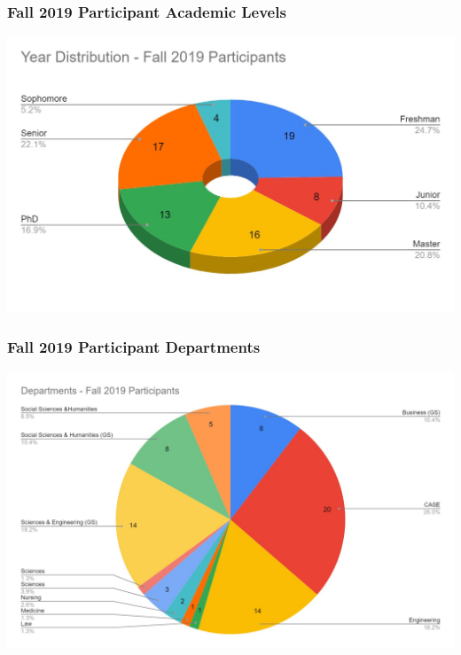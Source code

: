       \begin{frame}
        \frametitle{Fall 2019 Participant Academic Levels}
        \centering
        \includegraphics[height=0.75\textheight]{images/year_distribution_selected_fall2019.jpg}
      \end{frame}

      \begin{frame}
        \frametitle{Fall 2019 Participant Departments}
        \centering
        \includegraphics[height=0.75\textheight]{images/departments_selected_fall2019.jpg}
      \end{frame}

